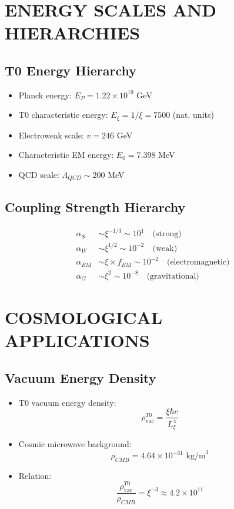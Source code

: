 \documentclass[12pt,a4paper]{article}
\begin{document}
	\section{ENERGY SCALES AND HIERARCHIES}
	
	\subsection{T0 Energy Hierarchy}
	\begin{itemize}
		\item Planck energy: $E_P = 1.22 \times 10^{19}$ GeV
		\item T0 characteristic energy: $E_\xi = 1/\xi = 7500$ (nat. units)
		\item Electroweak scale: $v = 246$ GeV
		\item Characteristic EM energy: $E_0 = 7.398$ MeV
		\item QCD scale: $\Lambda_{QCD} \sim 200$ MeV
	\end{itemize}
	
	\subsection{Coupling Strength Hierarchy}
	\begin{align}
		\alpha_S &\sim \xi^{-1/3} \sim 10^{1} \quad \text{(strong)}\\
		\alpha_W &\sim \xi^{1/2} \sim 10^{-2} \quad \text{(weak)}\\
		\alpha_{EM} &\sim \xi \times f_{EM} \sim 10^{-2} \quad \text{(electromagnetic)}\\
		\alpha_G &\sim \xi^2 \sim 10^{-8} \quad \text{(gravitational)}
	\end{align}
	
	\section{COSMOLOGICAL APPLICATIONS}
	
	\subsection{Vacuum Energy Density}
	\begin{itemize}
		\item T0 vacuum energy density:
		$$\rho_{\text{vac}}^{T0} = \frac{\xi \hbar c}{L_\xi^4}$$
		
		\item Cosmic microwave background:
		$$\rho_{CMB} = 4.64 \times 10^{-31} \text{ kg/m}^3$$
		
		\item Relation:
		$$\frac{\rho_{\text{vac}}^{T0}}{\rho_{CMB}} = \xi^{-3} \approx 4.2 \times 10^{11}$$
	\end{itemize}
	
\end{document}
